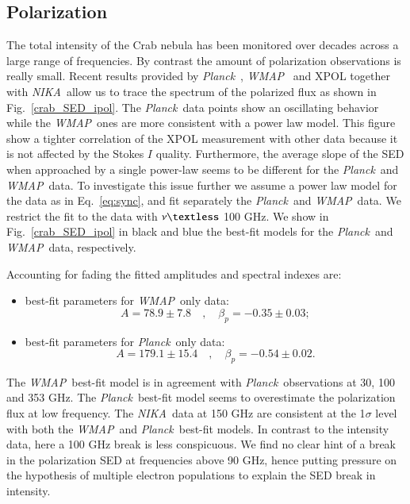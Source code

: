 \documentclass[twocolumn,traditabstract]{aa}
\def\NIKA{\textit{NIKA}}
\def\Planck{\textit{Planck}}
\def\WMAP{\textit{WMAP}}
\begin{document}
\subsection{Polarization}
The total intensity of the Crab nebula has been monitored over decades across a
large range of frequencies. By contrast the amount of polarization observations
is really small.  Recent results provided by
\Planck\ \citep{2015arXiv150702058P}, \WMAP\ \citep{2011ApJS..192...19W} and
XPOL \citep{aumont2010} together with \NIKA\ allow us to trace the spectrum of the polarized flux as shown in Fig.~\ref{crab_SED_ipol}.  The \Planck\ data points show an oscillating behavior while
the \WMAP\ ones are more consistent with a power law model. 
This figure  show a tighter correlation of 
the XPOL measurement with other data 
because it is not affected by the Stokes $I$ quality.
Furthermore, the
average slope of the SED when approached by a single power-law seems to be
different for the \Planck\ and \WMAP\ data.  To investigate this issue further
we assume a power law model for the data as in Eq.~\ref{eq:sync}, and fit
separately the \Planck\ and \WMAP\ data. We restrict the fit to the data with
$\nu \textless$ 100 GHz. We show in Fig.~\ref{crab_SED_ipol} in black and blue
the best-fit models for the \Planck\ and \WMAP\ data, respectively.

Accounting for fading the fitted amplitudes and spectral indexes are:
\begin{itemize}
\item best-fit parameters for \WMAP\ only data:
\begin{equation}
A = 78.9\pm7.8 \quad , \quad \beta_p = -0.35\pm0.03;
\end{equation}
\item best-fit parameters for \Planck\ only data:
\begin{equation}
A = 179.1\pm15.4 \quad , \quad \beta_p = -0.54\pm0.02.
\end{equation}
\end{itemize}

The \WMAP\ best-fit model is in agreement with \Planck\ observations at 30, 100
and 353 GHz.  The \Planck\ best-fit model seems to overestimate the polarization
flux at low frequency.  The \NIKA\ data at 150 GHz are consistent at the
1$\sigma$ level with both the \WMAP\ and \Planck\ best-fit models.  In contrast
to the intensity data, here a 100 GHz break is less conspicuous.
We find no clear hint of a break in the polarization SED
at frequencies above 90 GHz, hence putting pressure on the hypothesis of multiple electron populations to explain the SED break in intensity.
\end{document}
